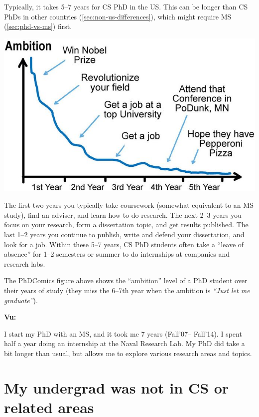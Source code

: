 \documentclass[oneside,11pt,dvipsnames]{book}
\newenvironment{commentbox}[1][]{
  \small
  \begin{mybox}
    {\small \textbf{#1}}
  }{
  \end{mybox}
}
\def\sectioninfo#1{%
  \addcontentsline{toc}{sectioninfo}{%
    \noexpand\numberline{}\color{black}{#1}}%
}
\begin{document}
Typically, it takes 5--7 years for CS PhD in the US.  This can be longer than CS PhDs in other countries (\autoref{sec:non-us-differences}), which might require MS (\autoref{sec:phd-vs-ms}) first. 


\begin{center}
  \includegraphics[scale=0.5]{files/c4a.png}
\end{center}

The first two years you typically take coursework (somewhat equivalent to an MS study), find an adviser, and learn how to do research.  The next 2--3 years you focus on your research, form a dissertation topic, and get results published. The last 1--2 years you continue to publish, write and defend your dissertation, and look for a job.
Within these 5--7 years, CS PhD students often take a ``leave of absence'' for 1--2 semesters or summer to do internships at companies and research labs.

The PhDComics figure above shows the ``ambition'' level of a PhD student over their years of study (they miss the 6--7th year when the ambition is \emph{``Just let me graduate''}).

\begin{commentbox}[Vu:]
    I start my PhD with an MS, and it took me 7 years (Fall'07-- Fall'14). I spent half a year doing an internship at the Naval Research Lab. My PhD did take a bit longer than usual, but allows me to explore various research areas and topics.
  \end{commentbox}

\section{My undergrad was not in CS or related areas}\label{sec:non-stem}
\sectioninfo{You can successfully apply to CS PhD even if you have non-CS background.}
\end{document}
